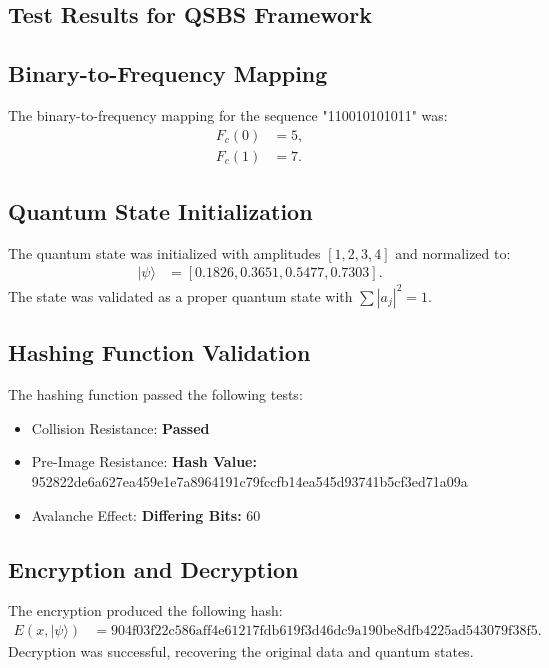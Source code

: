 \documentclass{article}
\theoremstyle{plain}
\begin{document}
\begin{itemize}
\begin{itemize}
\section{Test Results for QSBS Framework}

\subsection{Binary-to-Frequency Mapping}
The binary-to-frequency mapping for the sequence "110010101011" was:
\begin{align*}
F_c(0) &= 5, \\
F_c(1) &= 7.
\end{align*}

\subsection{Quantum State Initialization}
The quantum state was initialized with amplitudes $[1, 2, 3, 4]$ and normalized to:
\begin{align*}
|\psi\rangle &= [0.1826, 0.3651, 0.5477, 0.7303].
\end{align*}
The state was validated as a proper quantum state with $\sum |a_j|^2 = 1$.

\subsection{Hashing Function Validation}
The hashing function passed the following tests:
\begin{itemize}
    \item Collision Resistance: \textbf{Passed}
    \item Pre-Image Resistance: \textbf{Hash Value:} 952822de6a627ea459e1e7a8964191c79fccfb14ea545d93741b5cf3ed71a09a
    \item Avalanche Effect: \textbf{Differing Bits:} 60
\end{itemize}

\subsection{Encryption and Decryption}
The encryption produced the following hash:
\begin{align*}
E(x, |\psi\rangle) &= \text{904f03f22c586aff4e61217fdb619f3d46dc9a190be8dfb4225ad543079f38f5}.
\end{align*}
Decryption was successful, recovering the original data and quantum states.


\end{itemize}
\end{itemize}
\end{document}
